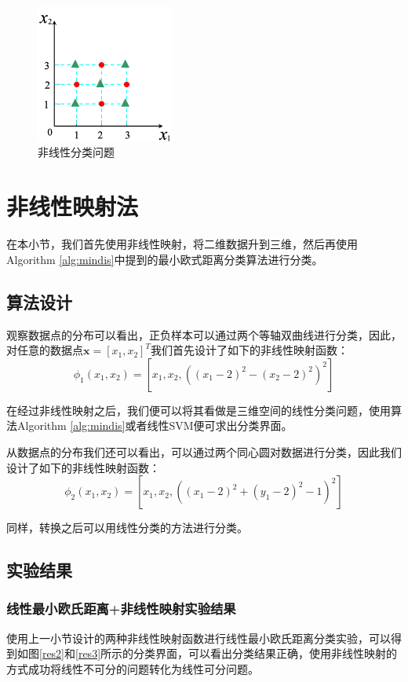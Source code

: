 \documentclass[cn]{elegantbook}
\begin{document}
\begin{figure}[!h]
	\centering
	\includegraphics[width=0.4\textwidth]{images/ex2}
	\caption{\label{ex2}非线性分类问题}
\end{figure}

\section{非线性映射法}
在本小节，我们首先使用非线性映射，将二维数据升到三维，然后再使用Algorithm \ref{alg:mindis}中提到的最小欧式距离分类算法进行分类。

\subsection{算法设计}
观察数据点的分布可以看出，正负样本可以通过两个等轴双曲线进行分类，因此，对任意的数据点$\mathbf{x}=[x_1,x_2]^T$我们首先设计了如下的非线性映射函数：
\begin{equation}
\phi_1(x_1,x_2)=\left[x_1,x_2,\left((x_1-2)^2-(x_2-2)^2\right)^2\right]
\end{equation}

在经过非线性映射之后，我们便可以将其看做是三维空间的线性分类问题，使用算法Algorithm \ref{alg:mindis}或者线性SVM便可求出分类界面。

从数据点的分布我们还可以看出，可以通过两个同心圆对数据进行分类，因此我们设计了如下的非线性映射函数：
\begin{equation}
\phi_2(x_1,x_2)=\left[x_1, x_2, \left((x_1-2)^2+(y_1-2)^2-1\right)^2\right]
\end{equation}

同样，转换之后可以用线性分类的方法进行分类。

\subsection{实验结果}
\subsubsection{线性最小欧氏距离+非线性映射实验结果}
使用上一小节设计的两种非线性映射函数进行线性最小欧氏距离分类实验，可以得到如图\ref{res2}和\ref{res3}所示的分类界面，可以看出分类结果正确，使用非线性映射的方式成功将线性不可分的问题转化为线性可分问题。
\end{document}

